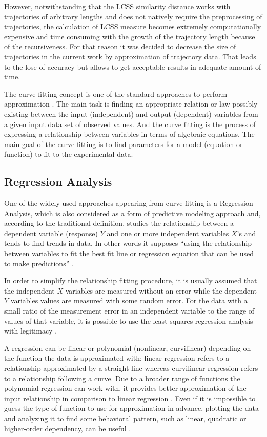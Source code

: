 However, notwithstanding that the LCSS similarity distance works with trajectories of arbitrary lengths and does not natively require the preprocessing of trajectories, the calculation of LCSS measure becomes extremely computationally expensive and time consuming with the growth of the trajectory length because of the recursiveness. For that reason it was decided to decrease the size of trajectories in the current work by approximation of trajectory data. That leads to the lose of accuracy but allows to get acceptable results in adequate amount of time.

The curve fitting concept is one of the standard approaches to perform approximation \cite{article:behav_form_extr}. The main task is finding an appropriate relation or law possibly existing between the input (independent) and output (dependent) variables from a given input data set of observed values. And the curve fitting is the process of expressing a relationship between variables in terms of algebraic equations. The main goal of the curve fitting is to find parameters for a model (equation or function) to fit to the experimental data. 

\subsection{Regression Analysis}

One of the widely used approaches appearing from curve fitting is a Regression Analysis, which is also considered as a form of predictive modeling approach and, according to the traditional definition, studies the relationship between a dependent variable (response) $Y$ and one or more independent variables $X$'s and tends to find trends in data. In other words it supposes ``using the relationship between variables to fit the best fit line or regression equation that can be used to make predictions'' \cite{online:intro_lr_pr}.

In order to simplify the relationship fitting procedure, it is usually assumed that the independent $X$ variables are measured without an error while the dependent $Y$ variables values are measured with some random error. For the data with a small ratio of the measurement error in an independent variable to the range of values of that variable, it is possible to use the least squares regression analysis with legitimacy \cite{article:behav_form_extr}.

A regression can be linear or polynomial (nonlinear, curvilinear) depending on the function the data is approximated with: linear regression refers to a relationship approximated by a straight line whereas curvilinear regression refers to a relationship following a curve. Due to a broader range of functions the polynomial regression can work with, it provides better approximation of the input relationship in comparison to linear regression \cite{online:intro_lr_pr}. Even if it is impossible to guess the type of function to use for approximation in advance, plotting the data and analyzing it to find some behavioral pattern, such as linear, quadratic or higher-order dependency, can be useful \cite{article:behav_form_extr}. 

